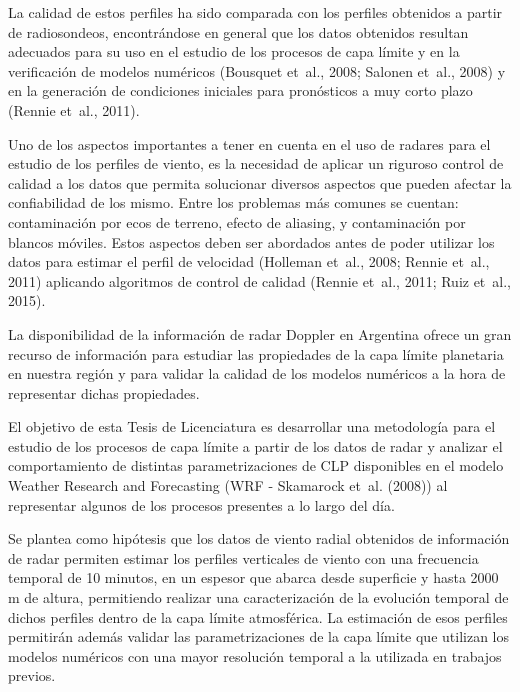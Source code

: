 \documentclass[12pt,spanish,oneside]{book}
\begin{document}
La calidad de estos perfiles ha sido comparada con los perfiles
obtenidos a partir de radiosondeos, encontrándose en general que los
datos obtenidos resultan adecuados para su uso en el estudio de los
procesos de capa límite y en la verificación de modelos numéricos
(Bousquet et~al., 2008; Salonen et~al., 2008) y en la generación de
condiciones iniciales para pronósticos a muy corto plazo (Rennie et~al.,
2011).

Uno de los aspectos importantes a tener en cuenta en el uso de radares
para el estudio de los perfiles de viento, es la necesidad de aplicar un
riguroso control de calidad a los datos que permita solucionar diversos
aspectos que pueden afectar la confiabilidad de los mismo. Entre los
problemas más comunes se cuentan: contaminación por ecos de terreno,
efecto de aliasing, y contaminación por blancos móviles. Estos aspectos
deben ser abordados antes de poder utilizar los datos para estimar el
perfil de velocidad (Holleman et~al., 2008; Rennie et~al., 2011)
aplicando algoritmos de control de calidad (Rennie et~al., 2011; Ruiz
et~al., 2015).

La disponibilidad de la información de radar Doppler en Argentina ofrece
un gran recurso de información para estudiar las propiedades de la capa
límite planetaria en nuestra región y para validar la calidad de los
modelos numéricos a la hora de representar dichas propiedades.

El objetivo de esta Tesis de Licenciatura es desarrollar una metodología
para el estudio de los procesos de capa límite a partir de los datos de
radar y analizar el comportamiento de distintas parametrizaciones de CLP
disponibles en el modelo Weather Research and Forecasting (WRF -
Skamarock et~al. (2008)) al representar algunos de los procesos
presentes a lo largo del día.

Se plantea como hipótesis que los datos de viento radial obtenidos de
información de radar permiten estimar los perfiles verticales de viento
con una frecuencia temporal de 10 minutos, en un espesor que abarca
desde superficie y hasta 2000 m de altura, permitiendo realizar una
caracterización de la evolución temporal de dichos perfiles dentro de la
capa límite atmosférica. La estimación de esos perfiles permitirán
además validar las parametrizaciones de la capa límite que utilizan los
modelos numéricos con una mayor resolución temporal a la utilizada en
trabajos previos.
\end{document}
